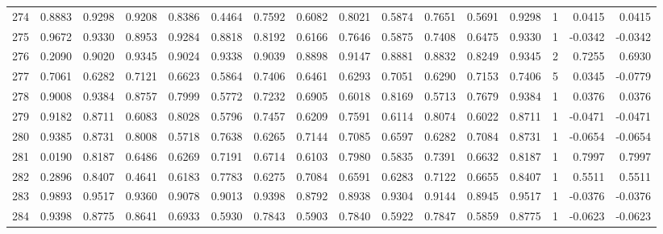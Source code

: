 \begin{tabular}{lrrrrrrrrrrrrrrr}
274 &      0.8883 &  0.9298 &  0.9208 &  0.8386 &  0.4464 &  0.7592 &  0.6082 &  0.8021 &  0.5874 &  0.7651 &   0.5691 &     0.9298 &      1 &                    0.0415 &                     0.0415 \\
275 &      0.9672 &  0.9330 &  0.8953 &  0.9284 &  0.8818 &  0.8192 &  0.6166 &  0.7646 &  0.5875 &  0.7408 &   0.6475 &     0.9330 &      1 &                   -0.0342 &                    -0.0342 \\
276 &      0.2090 &  0.9020 &  0.9345 &  0.9024 &  0.9338 &  0.9039 &  0.8898 &  0.9147 &  0.8881 &  0.8832 &   0.8249 &     0.9345 &      2 &                    0.7255 &                     0.6930 \\
277 &      0.7061 &  0.6282 &  0.7121 &  0.6623 &  0.5864 &  0.7406 &  0.6461 &  0.6293 &  0.7051 &  0.6290 &   0.7153 &     0.7406 &      5 &                    0.0345 &                    -0.0779 \\
278 &      0.9008 &  0.9384 &  0.8757 &  0.7999 &  0.5772 &  0.7232 &  0.6905 &  0.6018 &  0.8169 &  0.5713 &   0.7679 &     0.9384 &      1 &                    0.0376 &                     0.0376 \\
279 &      0.9182 &  0.8711 &  0.6083 &  0.8028 &  0.5796 &  0.7457 &  0.6209 &  0.7591 &  0.6114 &  0.8074 &   0.6022 &     0.8711 &      1 &                   -0.0471 &                    -0.0471 \\
280 &      0.9385 &  0.8731 &  0.8008 &  0.5718 &  0.7638 &  0.6265 &  0.7144 &  0.7085 &  0.6597 &  0.6282 &   0.7084 &     0.8731 &      1 &                   -0.0654 &                    -0.0654 \\
281 &      0.0190 &  0.8187 &  0.6486 &  0.6269 &  0.7191 &  0.6714 &  0.6103 &  0.7980 &  0.5835 &  0.7391 &   0.6632 &     0.8187 &      1 &                    0.7997 &                     0.7997 \\
282 &      0.2896 &  0.8407 &  0.4641 &  0.6183 &  0.7783 &  0.6275 &  0.7084 &  0.6591 &  0.6283 &  0.7122 &   0.6655 &     0.8407 &      1 &                    0.5511 &                     0.5511 \\
283 &      0.9893 &  0.9517 &  0.9360 &  0.9078 &  0.9013 &  0.9398 &  0.8792 &  0.8938 &  0.9304 &  0.9144 &   0.8945 &     0.9517 &      1 &                   -0.0376 &                    -0.0376 \\
284 &      0.9398 &  0.8775 &  0.8641 &  0.6933 &  0.5930 &  0.7843 &  0.5903 &  0.7840 &  0.5922 &  0.7847 &   0.5859 &     0.8775 &      1 &                   -0.0623 &                    -0.0623 \\

\end{tabular}
